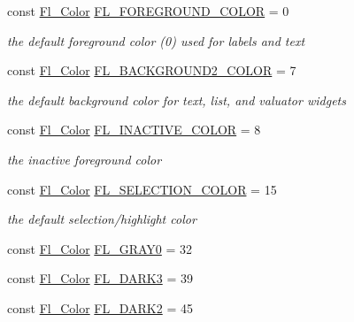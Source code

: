 \begin{DoxyCompactItemize}
const \hyperlink{_enumerations_8_h_a8b762953646f8abee866061f1af78a6a}{Fl\+\_\+\+Color} \hyperlink{_enumerations_8_h_a8c67b74501f259f9bcfbf55415cfc162}{F\+L\+\_\+\+F\+O\+R\+E\+G\+R\+O\+U\+N\+D\+\_\+\+C\+O\+L\+OR} = 0
\begin{DoxyCompactList}\small\item\em the default foreground color (0) used for labels and text \end{DoxyCompactList}\item 
const \hyperlink{_enumerations_8_h_a8b762953646f8abee866061f1af78a6a}{Fl\+\_\+\+Color} \hyperlink{_enumerations_8_h_a5c5704ed2ec5eb9c964d6dcb51474055}{F\+L\+\_\+\+B\+A\+C\+K\+G\+R\+O\+U\+N\+D2\+\_\+\+C\+O\+L\+OR} = 7
\begin{DoxyCompactList}\small\item\em the default background color for text, list, and valuator widgets \end{DoxyCompactList}\item 
const \hyperlink{_enumerations_8_h_a8b762953646f8abee866061f1af78a6a}{Fl\+\_\+\+Color} \hyperlink{_enumerations_8_h_a6501a998c459a5a117784f8c95a83a41}{F\+L\+\_\+\+I\+N\+A\+C\+T\+I\+V\+E\+\_\+\+C\+O\+L\+OR} = 8
\begin{DoxyCompactList}\small\item\em the inactive foreground color \end{DoxyCompactList}\item 
const \hyperlink{_enumerations_8_h_a8b762953646f8abee866061f1af78a6a}{Fl\+\_\+\+Color} \hyperlink{_enumerations_8_h_a331e6d52a8f08e7d9bafd9cc8341cd9f}{F\+L\+\_\+\+S\+E\+L\+E\+C\+T\+I\+O\+N\+\_\+\+C\+O\+L\+OR} = 15
\begin{DoxyCompactList}\small\item\em the default selection/highlight color \end{DoxyCompactList}\item 
const \hyperlink{_enumerations_8_h_a8b762953646f8abee866061f1af78a6a}{Fl\+\_\+\+Color} \hyperlink{_enumerations_8_h_a8ef3d23aaa32b3038315aebdb8cb3fe0}{F\+L\+\_\+\+G\+R\+A\+Y0} = 32
\item 
const \hyperlink{_enumerations_8_h_a8b762953646f8abee866061f1af78a6a}{Fl\+\_\+\+Color} \hyperlink{_enumerations_8_h_ad723ee5e7504ff3c0f07dbe34e894b9f}{F\+L\+\_\+\+D\+A\+R\+K3} = 39
\item 
const \hyperlink{_enumerations_8_h_a8b762953646f8abee866061f1af78a6a}{Fl\+\_\+\+Color} \hyperlink{_enumerations_8_h_ac11e9d182f35ff5fb029a0a28d12d919}{F\+L\+\_\+\+D\+A\+R\+K2} = 45
\item 

\end{DoxyCompactItemize}
